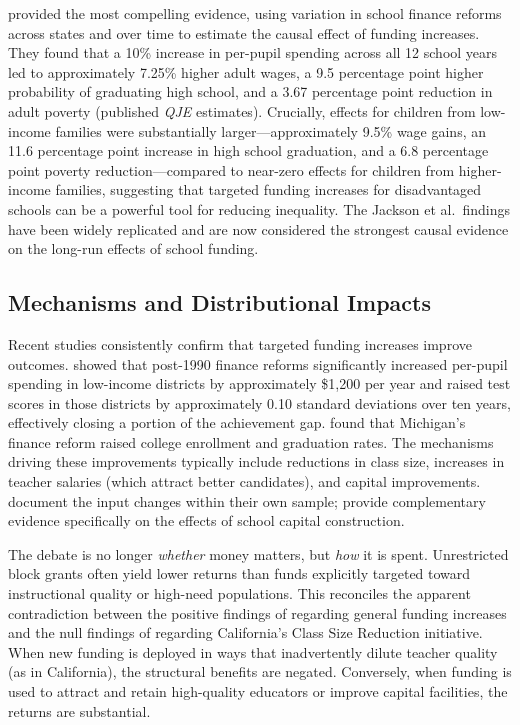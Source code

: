 \documentclass[12pt,letterpaper]{article}
\begin{document}
\citet{jackson2016} provided the most compelling evidence, using variation in school finance reforms across states and over time to estimate the causal effect of funding increases. They found that a 10\% increase in per-pupil spending across all 12 school years led to approximately 7.25\% higher adult wages, a 9.5 percentage point higher probability of graduating high school, and a 3.67 percentage point reduction in adult poverty (published \textit{QJE} estimates). Crucially, effects for children from low-income families were substantially larger---approximately 9.5\% wage gains, an 11.6 percentage point increase in high school graduation, and a 6.8 percentage point poverty reduction---compared to near-zero effects for children from higher-income families, suggesting that targeted funding increases for disadvantaged schools can be a powerful tool for reducing inequality. The Jackson et al.\ findings have been widely replicated and are now considered the strongest causal evidence on the long-run effects of school funding.

\subsection{Mechanisms and Distributional Impacts}

Recent studies consistently confirm that targeted funding increases improve outcomes. \citet{lafortune2018} showed that post-1990 finance reforms significantly increased per-pupil spending in low-income districts by approximately \$1,200 per year and raised test scores in those districts by approximately 0.10 standard deviations over ten years, effectively closing a portion of the achievement gap. \citet{hyman2017} found that Michigan's finance reform raised college enrollment and graduation rates. The mechanisms driving these improvements typically include reductions in class size, increases in teacher salaries (which attract better candidates), and capital improvements. \citet{jackson2016} document the input changes within their own sample; \citet{neilson2014} provide complementary evidence specifically on the effects of school capital construction.

The debate is no longer \textit{whether} money matters, but \textit{how} it is spent. Unrestricted block grants often yield lower returns than funds explicitly targeted toward instructional quality or high-need populations. This reconciles the apparent contradiction between the positive findings of \citet{jackson2016} regarding general funding increases and the null findings of \citet{jepsen2009} regarding California's Class Size Reduction initiative. When new funding is deployed in ways that inadvertently dilute teacher quality (as in California), the structural benefits are negated. Conversely, when funding is used to attract and retain high-quality educators or improve capital facilities, the returns are substantial.
\end{document}
